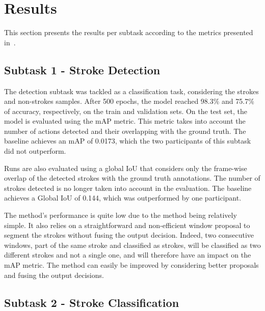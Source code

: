 \documentclass[sigconf]{acmart-me}
\begin{document}
\section{Results}

This section presents the results per subtask according to the metrics presented in~\cite{mediaeval/Martin21/task}.
\vspace{-7pt}
\subsection{Subtask 1 - Stroke Detection}

The detection subtask was tackled as a classification task, considering the strokes and non-strokes samples. After 500 epochs, the model reached 98.3\% and 75.7\% of accuracy, respectively, on the train and validation sets. On the test set, the model is evaluated using the mAP metric. This metric takes into account the number of actions detected and their overlapping with the ground truth. The baseline achieves an mAP of 0.0173, which the two participants of this subtask did not outperform.
\par
Runs are also evaluated using a global IoU that considers only the frame-wise overlap of the detected strokes with the ground truth annotations. The number of strokes detected is no longer taken into account in the evaluation. The baseline achieves a Global IoU of 0.144, which was outperformed by one participant.
\par
The method’s performance is quite low due to the method being relatively simple. It also relies on a straightforward and non-efficient window proposal to segment the strokes without fusing the output decision. Indeed, two consecutive windows, part of the same stroke and classified as strokes, will be classified as two different strokes and not a single one, and will therefore have an impact on the mAP metric. The method can easily be improved by considering better proposals and fusing the output decisions.
\vspace{-7pt}
\subsection{Subtask 2 - Stroke Classification}
\end{document}
